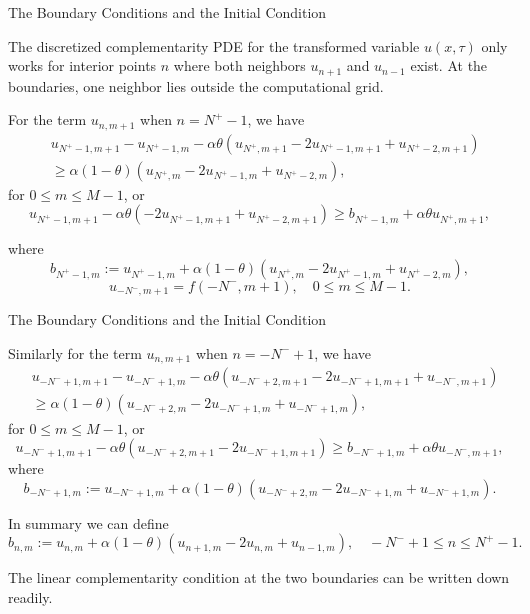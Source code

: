 \documentclass{beamer}
\begin{document}
\begin{frame}{The Boundary Conditions and the Initial Condition}

    {\footnotesize \footnotesize
    The discretized complementarity PDE for the transformed variable $u(x,\tau)$ only works for interior points
    $n$ where both neighbors $u_{n+1}$ and $u_{n-1}$ exist. 
    At the boundaries, one neighbor lies outside the computational grid.
    \vspace{1em}

     \pause For the term $u_{n,m+1}$ when $n = N^{+} - 1$, we have
    \begin{align*}
    &u_{N^{+}-1,m+1} - u_{N^{+}-1,m} - \alpha \theta (u_{N^{+},m+1} - 2u_{N^{+}-1,m+1} + u_{N^{+}-2,m+1}) \\
    &\geq \alpha(1 - \theta) (u_{N^{+},m} - 2u_{N^{+}-1,m} + u_{N^{+}-2,m}), 
    \end{align*}
    for $0 \leq m \leq M - 1$, or
    \[
    u_{N^{+}-1,m+1} - \alpha \theta (-2u_{N^{+}-1,m+1} + u_{N^{+}-2,m+1}) \geq b_{N^{+}-1,m} + 
    \alpha \theta u_{N^{+},m+1},
    \]

     \pause where
    \[
    b_{N^{+}-1,m} := u_{N^{+}-1,m} + \alpha (1 - \theta) (u_{N^{+},m} - 2u_{N^{+}-1,m} + u_{N^{+}-2,m}),
    \]
    \[
    u_{-N^{-},m+1} = f(-N^{-},m+1), \quad 0 \leq m \leq M - 1.
    \]
    }
    
    
\end{frame}

\begin{frame}{The Boundary Conditions and the Initial Condition}

    {\footnotesize \footnotesize
    Similarly for the term $u_{n,m+1}$ when $n = -N^{-} + 1$, we have
    \begin{align*}
    &u_{-N^{-}+1,m+1} - u_{-N^{-}+1,m} - \alpha \theta (u_{-N^{-}+2,m+1} - 2u_{-N^{-}+1,m+1} + u_{-N^{-},m+1}) \\
    &\geq \alpha (1 - \theta) (u_{-N^{-}+2,m} - 2u_{-N^{-}+1,m} + u_{-N^{-}+1,m}),
    \end{align*}
    for $0 \leq m \leq M - 1$, or
    \[
    u_{-N^{-}+1,m+1} - \alpha \theta (u_{-N^{-}+2,m+1} - 2u_{-N^{-}+1,m+1}) 
    \geq b_{-N^{-}+1,m} + \alpha \theta u_{-N^{-},m+1}, 
    \]
     \pause where
    \[
    b_{-N^{-}+1,m} := u_{-N^{-}+1,m} + \alpha (1 - \theta) (u_{-N^{-}+2,m} - 2u_{-N^{-}+1,m} + u_{-N^{-}+1,m}).
    \]

    In summary we can define
    \[
    b_{n,m} := u_{n,m} + \alpha (1 - \theta) (u_{n+1,m} - 2u_{n,m} + u_{n-1,m}),
    \quad -N^{-} + 1 \leq n \leq N^{+} - 1. 
    \]

    The linear complementarity condition at the two boundaries can be written down readily.

    }
    
    
\end{frame}
\end{document}
